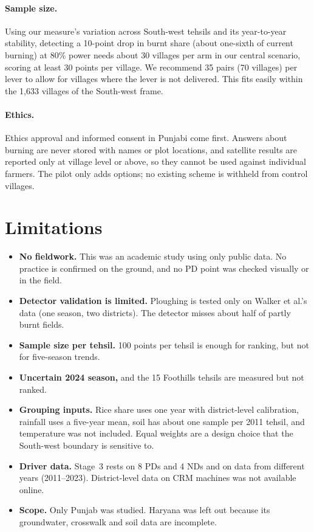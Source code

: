\documentclass[sigconf,nonacm]{acmart}
\begin{document}
\paragraph{Sample size.} Using our measure's variation across South-west tehsils and its year-to-year stability, detecting a 10-point drop in burnt share (about one-sixth of current burning) at 80\% power needs about 30 villages per arm in our central scenario, scoring at least 30 points per village. We recommend 35 pairs (70 villages) per lever to allow for villages where the lever is not delivered. This fits easily within the 1,633 villages of the South-west frame.

\paragraph{Ethics.} Ethics approval and informed consent in Punjabi come first. Answers about burning are never stored with names or plot locations, and satellite results are reported only at village level or above, so they cannot be used against individual farmers. The pilot only adds options; no existing scheme is withheld from control villages.

\section{Limitations}
\label{sec:limitations}

\begin{itemize}
  \item \textbf{No fieldwork.} This was an academic study using only public data. No practice is confirmed on the ground, and no PD point was checked visually or in the field.
  \item \textbf{Detector validation is limited.} Ploughing is tested only on Walker et al.'s data (one season, two districts). The detector misses about half of partly burnt fields.
  \item \textbf{Sample size per tehsil.} 100 points per tehsil is enough for ranking, but not for five-season trends.
  \item \textbf{Uncertain 2024 season,} and the 15 Foothills tehsils are measured but not ranked.
  \item \textbf{Grouping inputs.} Rice share uses one year with district-level calibration, rainfall uses a five-year mean, soil has about one sample per 2011 tehsil, and temperature was not included. Equal weights are a design choice that the South-west boundary is sensitive to.
  \item \textbf{Driver data.} Stage~3 rests on 8 PDs and 4 NDs and on data from different years (2011--2023). District-level data on CRM machines was not available online.
  \item \textbf{Scope.} Only Punjab was studied. Haryana was left out because its groundwater, crosswalk and soil data are incomplete.
\end{itemize}
\end{document}
